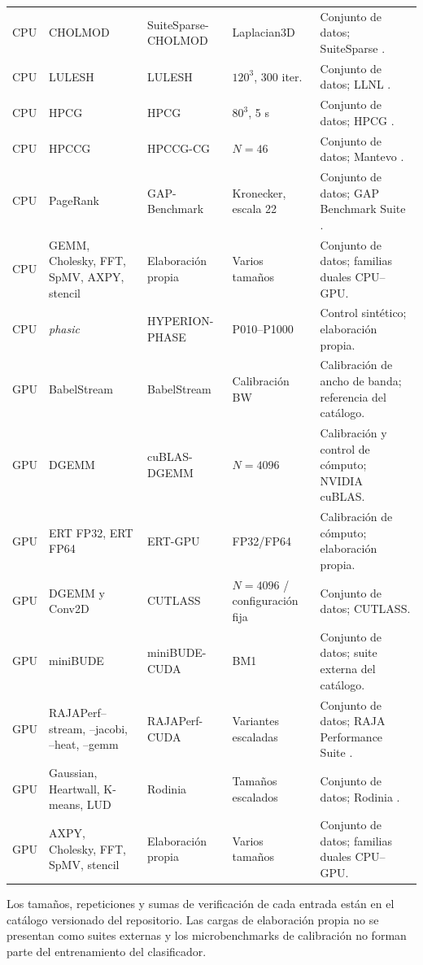 {\begin{longtable}{@{}p{1.5cm}p{3.7cm}p{2.6cm}p{2.1cm}p{4.1cm}@{}}
CPU & CHOLMOD & SuiteSparse-CHOLMOD & Laplacian3D & Conjunto de datos; SuiteSparse \cite{Davis2008}. \\
CPU & LULESH & LULESH & $120^3$, 300 iter. & Conjunto de datos; LLNL \cite{Karlin2013}. \\
CPU & HPCG & HPCG & $80^3$, 5 s & Conjunto de datos; HPCG \cite{Dongarra2016}. \\
CPU & HPCCG & HPCCG-CG & $N=46$ & Conjunto de datos; Mantevo \cite{Heroux2009}. \\
CPU & PageRank & GAP-Benchmark & Kronecker, escala 22 & Conjunto de datos; GAP Benchmark Suite \cite{Beamer2015}. \\
CPU & GEMM, Cholesky, FFT, SpMV, AXPY, stencil & Elaboración propia & Varios tamaños & Conjunto de datos; familias duales CPU--GPU. \\
CPU & \textit{phasic} & HYPERION-PHASE & P010--P1000 & Control sintético; elaboración propia. \\
GPU & BabelStream & BabelStream & Calibración BW & Calibración de ancho de banda; referencia del catálogo. \\
GPU & DGEMM & cuBLAS-DGEMM & $N=4096$ & Calibración y control de cómputo; NVIDIA cuBLAS. \\
GPU & ERT FP32, ERT FP64 & ERT-GPU & FP32/FP64 & Calibración de cómputo; elaboración propia. \\
GPU & DGEMM y Conv2D & CUTLASS & $N=4096$ / configuración fija & Conjunto de datos; CUTLASS. \\
GPU & miniBUDE & miniBUDE-CUDA & BM1 & Conjunto de datos; suite externa del catálogo. \\
GPU & RAJAPerf--stream, --jacobi, --heat, --gemm & RAJAPerf-CUDA & Variantes escaladas & Conjunto de datos; RAJA Performance Suite \cite{Beckingsale2019}. \\
GPU & Gaussian, Heartwall, K-means, LUD & Rodinia & Tamaños escalados & Conjunto de datos; Rodinia \cite{Che2009}. \\
GPU & AXPY, Cholesky, FFT, SpMV, stencil & Elaboración propia & Varios tamaños & Conjunto de datos; familias duales CPU--GPU. \\
\end{longtable}}

Los tamaños, repeticiones y sumas de verificación de cada entrada están en el catálogo versionado del repositorio. Las cargas de elaboración propia no se presentan como suites externas y los microbenchmarks de calibración no forman parte del entrenamiento del clasificador.

